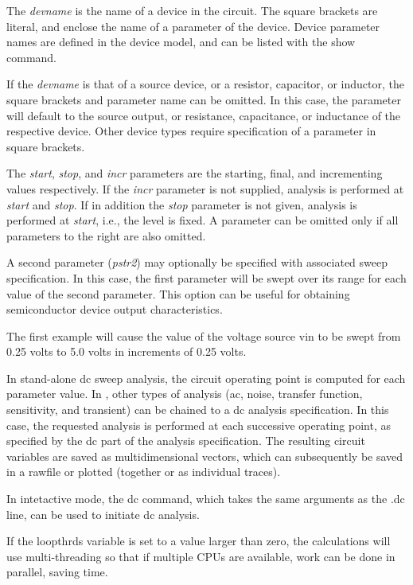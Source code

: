 The {\it devname} is the name of a device in the circuit.  The square
brackets are literal, and enclose the name of a parameter of the
device.  Device parameter names are defined in the device model, and
can be listed with the {\cb show} command.

If the {\it devname} is that of a source device, or a resistor,
capacitor, or inductor, the square brackets and parameter name can be
omitted.  In this case, the parameter will default to the source
output, or resistance, capacitance, or inductance of the respective
device.  Other device types require specification of a parameter in
square brackets.

The {\it start\/}, {\it stop\/}, and {\it incr} parameters are the
starting, final, and incrementing values respectively.  If the {\it
incr} parameter is not supplied, analysis is performed at {\it start}
and {\it stop\/}.  If in addition the {\it stop} parameter is not
given, analysis is performed at {\it start\/}, i.e., the level is
fixed.  A parameter can be omitted only if all parameters to the right
are also omitted.

A second parameter ({\it pstr2\/}) may optionally be specified with
associated sweep specification.  In this case, the first parameter
will be swept over its range for each value of the second parameter. 
This option can be useful for obtaining semiconductor device output
characteristics.

The first example will cause the value of the voltage source {\vt vin}
to be swept from 0.25 volts to 5.0 volts in increments of 0.25 volts.

In stand-alone dc sweep analysis, the circuit operating point is
computed for each parameter value.  In {\WRspice}, other types of
analysis (ac, noise, transfer function, sensitivity, and transient)
can be chained to a dc analysis specification.  In this case, the
requested analysis is performed at each successive operating point, as
specified by the dc part of the analysis specification.  The resulting
circuit variables are saved as multidimensional vectors, which can
subsequently be saved in a rawfile or plotted (together or as
individual traces).

In intetactive mode, the {\cb dc} command, which takes the same
arguments as the {\vt .dc} line, can be used to initiate dc analysis.

If the {\et loopthrds} variable is set to a value larger than zero,
the calculations will use multi-threading so that if multiple CPUs are
available, work can be done in parallel, saving time.

